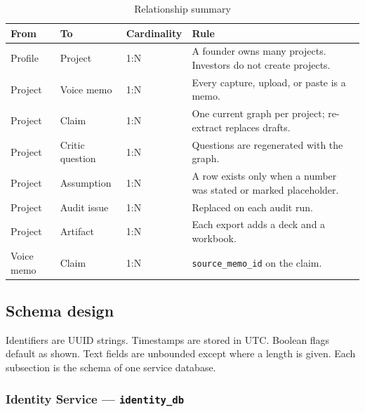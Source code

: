 \documentclass[11pt,a4paper]{article}
\begin{document}
\begin{table}[ht]
\centering
\caption{Relationship summary}
\label{tab:rels}
\small
\begin{tabular}{@{}llll@{}}
\toprule
\textbf{From} & \textbf{To} & \textbf{Cardinality} & \textbf{Rule} \\
\midrule
Profile & Project & 1:N & A founder owns many projects. Investors do not create projects. \\
Project & Voice memo & 1:N & Every capture, upload, or paste is a memo. \\
Project & Claim & 1:N & One current graph per project; re-extract replaces drafts. \\
Project & Critic question & 1:N & Questions are regenerated with the graph. \\
Project & Assumption & 1:N & A row exists only when a number was stated or marked placeholder. \\
Project & Audit issue & 1:N & Replaced on each audit run. \\
Project & Artifact & 1:N & Each export adds a deck and a workbook. \\
Voice memo & Claim & 1:N & \texttt{source\_memo\_id} on the claim. \\
\bottomrule
\end{tabular}
\end{table}

\subsection{Schema design}

Identifiers are UUID strings. Timestamps are stored in UTC. Boolean flags default as shown. Text fields are unbounded except where a length is given. Each subsection is the schema of one service database.

\subsubsection{Identity Service --- \texttt{identity\_db}}
\end{document}
